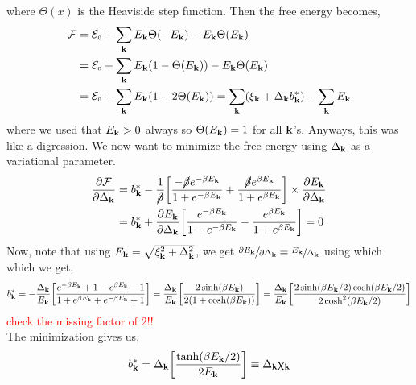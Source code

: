 \documentclass{article}
\newcommand{\tund}[1]{_{\text{\tiny #1}}}
\newcommand{\SE}{\mathcal{E}}
\newcommand{\SF}{\mathcal{F}}
\newcommand{\vk}{\vb{k}}
\begin{document}
where $\Theta(x)$ is the Heaviside step function. Then the free energy becomes,
\begin{align}
   \begin{split}
     \SF &= \SE\tund{0} +\sum\limits_{\vk} E_{\vk}\Theta(-E_{\vk})-E_{\vk}\Theta(E_{\vk})\\
    &=\SE\tund{0} +\sum\limits_{\vk} E_{\vk}(1 - \Theta(E_{\vk}))-E_{\vk}\Theta(E_{\vk})\\
    &=\SE\tund{0} +\sum\limits_{\vk} E_{\vk}(1 - 2\Theta(E_{\vk})) = \sum\limits_{\vk}(\xi_{\vk} +\Delta_{\vk}b_{\vk}^*) -\sum\limits_{\vk} E_{\vk}
   \end{split}
\end{align}
where we used that $E_{\vk}>0$ always so $\Theta(E_{\vk})=1$ for all $\vk$'s. Anyways, this was like a digression. We now want to minimize the free energy using $\Delta_{\vk}$ as a variational parameter. 
\begin{align}
    \begin{split}
        \pdv{\SF}{\Delta_{\vk}} &= b_{\vk}^* -\frac{1}{\cancel{\beta}}\qty[\frac{-\cancel{\beta} e^{-{\beta} E_{\vk}}}{1+e^{-\beta E_{\vk}}} +\frac{\cancel{\beta} e^{\beta E_{\vk}}}{1+e^{\beta E_{\vk}}}]\times \pdv{E_{\vk}}{\Delta_{\vk}}\\
        &=b_{\vk}^* +\pdv{E_{\vk}}{\Delta_{\vk}} \qty[\frac{e^{-{\beta} E_{\vk}}}{1+e^{-\beta E_{\vk}}} -\frac{ e^{\beta E_{\vk}}}{1+e^{\beta E_{\vk}}}]  = 0
    \end{split}
\end{align}
Now, note that using $E_{\vk} = \sqrt{\xi_{\vk}^2+\Delta_{\vk}^2}$, we get $\sfrac{\partial E_{\vk}}{\partial \Delta_{\vk}} =\sfrac{ E_{\vk}}{\Delta_{\vk}} $ using which which we get,
\begin{align}
    \begin{split}
        b_{\vk}^* = -\frac{\Delta_{\vk}}{E_{\vk}}\qty[\frac{e^{-\beta E_{\vk}} + 1 - e^{\beta E_{\vk}}-1}{1 + e^{\beta E_{\vk}} + e^{-\beta E_{\vk} }+1}] = \frac{\Delta_{\vk}}{E_{\vk}}\qty[\frac{2\sinh(\beta E_{\vk})}{2(1+\cosh(\beta E_{\vk}))}] =\frac{\Delta_{\vk}}{E_{\vk}} \qty[\frac{2\sinh(\beta E_{\vk}/2)\cosh(\beta E_{\vk}/2)}{2 \cosh^2(\beta E_{\vk}/2)}]
    \end{split}
\end{align}
\textcolor{red}{check the missing factor of $2$!!}\\
The minimization gives us, 
\begin{equation}
    b_{\vk}^* = \Delta_{\vk}\qty[\frac{\tanh(\beta E_{\vk}/2)}{2E_{\vk}}] \equiv \Delta_{\vk}\upchi_{\vk}
\end{equation}
\end{document}
